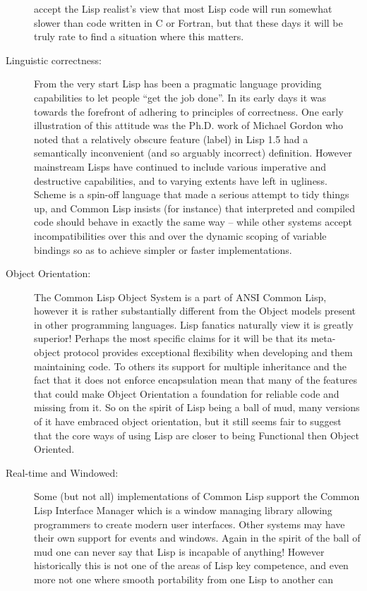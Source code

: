 \begin{description}
accept the Lisp realist's view that most Lisp code will run somewhat slower
than code written in C or Fortran, but that these days it will be truly
rate to find a situation where this matters.
\item[Linguistic correctness:] From the very start Lisp has been a pragmatic
language providing capabilities to let people ``get the job done''. In its
early days it was towards the forefront of adhering to principles of
correctness. One early illustration of this attitude was the Ph.D. work
of Michael Gordon\cite{MJCG} who noted that a relatively obscure
feature ({\tx label}) in Lisp 1.5 had a semantically inconvenient (and
so arguably incorrect) definition. However mainstream Lisps have continued
to include various imperative and destructive capabilities, and to varying
extents have left in ugliness. Scheme\cite{Scheme} is a spin-off language
that made a serious attempt to tidy things up, and Common Lisp insists (for
instance) that interpreted and compiled code should behave in exactly the
same way -- while other systems accept incompatibilities over this and over
the dynamic scoping of variable bindings so as to achieve simpler or
faster implementations.
\item[Object Orientation:] The Common Lisp Object System is a part of ANSI
Common Lisp, however it is rather substantially different from the Object
models present in other programming languages. Lisp fanatics naturally
view it is greatly superior! Perhaps the most specific claims for it will
be that its meta-object protocol provides exceptional flexibility when
developing and them maintaining code. To others its support for multiple
inheritance and the fact that it does not enforce encapsulation mean that
many of the features that could make Object Orientation a foundation for
reliable code and missing from it. So on the spirit of Lisp being a ball
of mud, many versions of it have embraced object orientation, but it still
seems fair to suggest that the core ways of using Lisp are closer to being
Functional then Object Oriented. 
\item[Real-time and Windowed:] Some (but not all) implementations of Common Lisp
support the Common Lisp Interface Manager which is a window managing
library allowing programmers to create modern user interfaces. Other systems
may have their own support for events and windows. Again in the spirit of the
ball of mud one can never say that Lisp is incapable of anything! However
historically this is not one of the areas of Lisp key competence, and
even more not one where smooth portability from one Lisp to another can

\end{description}
